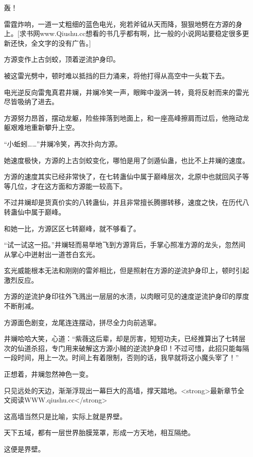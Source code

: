 
\begin{this_body}

轰！

雷霆炸响，一道一丈粗细的蓝色电光，宛若斧钺从天而降，狠狠地劈在方源的身上。[求书网www.Qiushu.cc想看的书几乎都有啊，比一般的小说网站要稳定很多更新还快，全文字的没有广告。]

方源变作上古剑蛟，顶着逆流护身印。

被这雷光劈中，顿时难以抵挡的巨力涌来，将他打得从高空中一头栽下去。

电光逆反向雷鬼真君井斓，井斓冷笑一声，眼眸中漩涡一转，竟将反射而来的雷光尽皆吸纳了进去。

方源努力昂首，摆动龙躯，险些摔落到地面上，和一座高峰擦肩而过后，他拖动龙躯艰难地重新攀升上空。

“小蚯蚓……”井斓冷笑，再次扑向方源。

她速度极快，方源的上古剑蛟变化，哪怕是用了剑遁仙蛊，也比不上井斓的速度。

方源的速度其实已经非常快了，在七转蛊仙中属于巅峰层次，北原中也就回风子等等几位，才在这方面和方源能一较高下。

不过井斓却是货真价实的八转蛊仙，并且非常擅长腾挪转移，速度之快，在历代八转蛊仙中属于巅峰。

和她一比，方源区区七转巅峰，就不够看了。

“试一试这一招。”井斓轻而易举地飞到方源背后，手掌心照准方源的龙头，忽然间从掌心中迸射出一道苍白玄光。

玄光威能根本无法和刚刚的雷斧相比，但是照射在方源的逆流护身印上，顿时引起激烈反应。

方源的逆流护身印往外飞溅出一层层的水渍，以肉眼可见的速度逆流护身印的厚度不断削减。

方源面色剧变，龙尾连连摆动，拼尽全力向前逃窜。

井斓哈哈大笑，心道：“紫薇这后辈，却是厉害，短短功夫，已经推算出了七转层次的仙道杀招，专门用来破解这方源小贼的逆流护身印！不过可惜，此招只能每隔一段时间，用上一次。时间上有着限制，否则的话，我早就将这小魔头宰了！”

正想着，井斓忽然神色一变。

只见远处的天边，渐渐浮现出一幕巨大的高墙，撑天踏地。<strong>最新章节全文阅读WWW.qiushu.cc</strong>

这高墙当然只是比喻，实际上就是界壁。

天下五域，都有一层世界胎膜笼罩，形成一方天地，相互隔绝。

这便是界壁。


\end{this_body}

